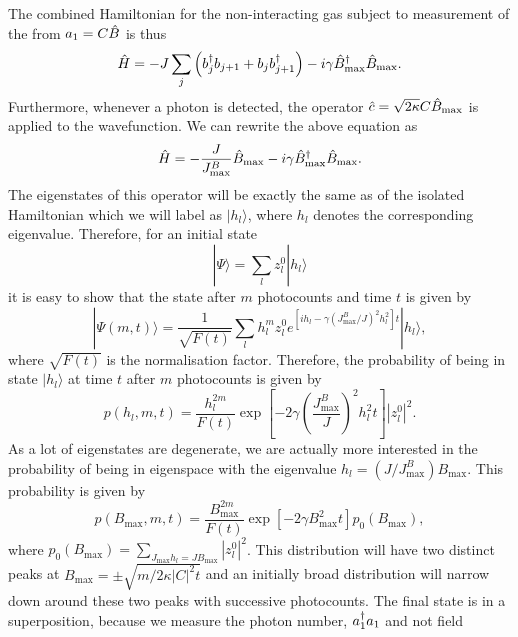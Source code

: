 The combined Hamiltonian for the non-interacting gas subject to
measurement of the from $a_1 = C \hat{B}$ is thus
\begin{equation}
  \hat{H} = -J \sum_j \left( b^\dagger_j b_{j+1} + b_j b^\dagger_{j+1} \right) - i
  \gamma \hat{B}_\mathrm{max}^\dagger \hat{B}_\mathrm{max}.
\end{equation} 
Furthermore, whenever a photon is detected, the operator
$\hat{c} = \sqrt{2 \kappa} C \hat{B}_\mathrm{max}$ is applied to the wavefunction. We can
rewrite the above equation as
\begin{equation}
  \hat{H} = -\frac{J}{J^B_\mathrm{max}} \hat{B}_\mathrm{max} - i \gamma \hat{B}_\mathrm{max}^\dagger \hat{B}_\mathrm{max}.
\end{equation}
The eigenstates of this operator will be exactly the same as of the
isolated Hamiltonian which we will label as $| h_l \rangle$, where
$h_l$ denotes the corresponding eigenvalue. Therefore, for an initial
state
\begin{equation}
  | \Psi \rangle = \sum_l z_l^0 | h_l \rangle
\end{equation}
it is easy to show that the state after $m$ photocounts and time $t$
is given by
\begin{equation}
  | \Psi (m,t) \rangle = \frac{1}{\sqrt{F(t)}} \sum_l h_l^m z_l^0 e^{[i h_l -
    \gamma(J^B_\mathrm{max}/J)^2 h_l^2]t} | h_l \rangle,
\end{equation}
where $\sqrt{F(t)}$ is the normalisation factor. Therefore, the probability
of being in state $| h_l \rangle$ at time $t$ after $m$ photocounts is
given by
\begin{equation}
  p(h_l, m, t) = \frac{h_l^{2m}} {F(t)} \exp\left[ - 2 \gamma \left(
    \frac{J^B_\mathrm{max}} {J} \right)^2 h_l^2 t \right] |z_l^0|^2.
\end{equation}
As a lot of eigenstates are degenerate, we are actually more
interested in the probability of being in eigenspace with the
eigenvalue $h_l = (J/J^B_\mathrm{max})B_\mathrm{max}$. This probability
is given by
\begin{equation}
  \label{eq:bmax}
  p(B_\mathrm{max}, m, t) = \frac{B_\mathrm{max}^{2m}} {F(t)} \exp\left[ - 2
    \gamma B_\mathrm{max}^2 t \right] p_0 (B_\mathrm{max}),
\end{equation}
where $p_0(B_\mathrm{max}) = \sum_{J_\mathrm{max} h_l = J
  B_\mathrm{max}} |z_l^0|^2$. This distribution will have two distinct
peaks at $B_\mathrm{max} = \pm \sqrt{m/2\kappa |C|^2 t}$ and an
initially broad distribution will narrow down around these two peaks
with successive photocounts. The final state is in a superposition,
because we measure the photon number, $a^\dagger_1 a_1$ and not field
